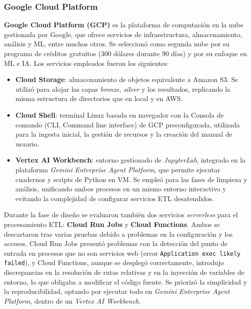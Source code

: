 \subsubsection{Google Cloud Platform}
\label{subsec:GCP_materiales}

\textbf{Google Cloud Platform (GCP)} es la plataforma de computación en la nube gestionada por Google, que ofrece servicios de infraestructura, almacenamiento, análisis y ML, entre muchos otros. Se seleccionó como segunda nube por su programa de créditos gratuitos (300 dólares durante 90 días) y por su enfoque en ML e IA. Los servicios empleados fueron los siguientes:

\begin{itemize}
	\item \textbf{Cloud Storage}: almacenamiento de objetos equivalente a Amazon S3. Se utilizó para alojar las capas \textit{bronze}, \textit{silver} y los resultados, replicando la misma estructura de directorios que en local y en AWS.
	\item \textbf{Cloud Shell}: terminal Linux basada en navegador con la Consola de comando (CLI, Command line interface) de GCP preconfigurada, utilizada para la ingesta inicial, la gestión de recursos y la creación del manual de usuario.
	\item \textbf{Vertex AI Workbench}: entorno gestionado de \textit{JupyterLab}, integrado en la plataforma \textit{Gemini Enterprise Agent Platform}, que permite ejecutar cuadernos y scripts de Python en VM. Se empleó para las fases de limpieza y análisis, unificando ambos procesos en un mismo entorno interactivo y evitando la complejidad de configurar servicios ETL desatendidos.
\end{itemize}

Durante la fase de diseño se evaluaron también dos servicios \textit{serverless} para el procesamiento ETL: \textbf{Cloud Run Jobs} y \textbf{Cloud Functions}. Ambos se descartaron tras varias pruebas debido a problemas en la configuración y los accesos. Cloud Run Jobs presentó problemas con la detección del punto de entrada en procesos que no son servicios web (error \texttt{Application exec likely failed}), y Cloud Functions, aunque se desplegó correctamente, introdujo discrepancias en la resolución de rutas relativas y en la inyección de variables de entorno, lo que obligaba a modificar el código fuente. Se priorizó la simplicidad y la reproducibilidad, optando por ejecutar todo en \textit{Gemini Enterprise Agent Platform}, dentro de un \textit{Vertex AI Workbench}.

